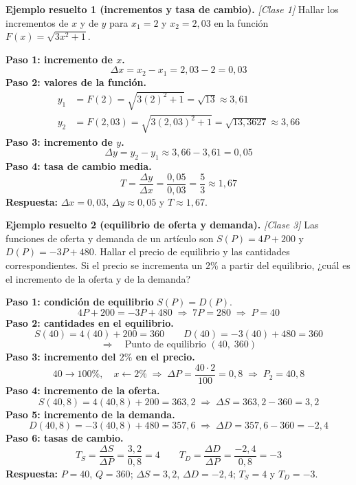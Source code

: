 \documentclass[12pt, letterpaper]{article}
\begin{document}
\noindent\textbf{Ejemplo resuelto 1 (incrementos y tasa de cambio).} \emph{[Clase 1]}
Hallar los incrementos de $x$ y de $y$ para $x_1 = 2$ y $x_2 = 2{,}03$ en la función $F(x) = \sqrt{3x^{2} + 1}$.

\begin{cuadrosolucion}
  \textbf{Paso 1: incremento de $x$.}
  \[
    \Delta x = x_2 - x_1 = 2{,}03 - 2 = 0{,}03
  \]
  \textbf{Paso 2: valores de la función.}
  \begin{align*}
    y_1 &= F(2) = \sqrt{3(2)^{2}+1} = \sqrt{13} \approx 3{,}61 \\
    y_2 &= F(2{,}03) = \sqrt{3(2{,}03)^{2}+1} = \sqrt{13{,}3627} \approx 3{,}66
  \end{align*}
  \textbf{Paso 3: incremento de $y$.}
  \[
    \Delta y = y_2 - y_1 \approx 3{,}66 - 3{,}61 = 0{,}05
  \]
  \textbf{Paso 4: tasa de cambio media.}
  \[
    T = \frac{\Delta y}{\Delta x} = \frac{0{,}05}{0{,}03} = \frac{5}{3} \approx 1{,}67
  \]
  \textbf{Respuesta:} $\Delta x = 0{,}03$, $\Delta y \approx 0{,}05$ y $T \approx 1{,}67$.
\end{cuadrosolucion}

\noindent\textbf{Ejemplo resuelto 2 (equilibrio de oferta y demanda).} \emph{[Clase 3]}
Las funciones de oferta y demanda de un artículo son $S(P) = 4P + 200$ y $D(P) = -3P + 480$. Hallar el precio de equilibrio y las cantidades correspondientes. Si el precio se incrementa un $2\%$ a partir del equilibrio, ¿cuál es el incremento de la oferta y de la demanda?

\begin{cuadrosolucion}
  \textbf{Paso 1: condición de equilibrio} $S(P) = D(P)$.
  \[
    4P + 200 = -3P + 480
    \;\Longrightarrow\; 7P = 280
    \;\Longrightarrow\; \boxed{P = 40}
  \]
  \textbf{Paso 2: cantidades en el equilibrio.}
  \[
    S(40) = 4(40) + 200 = 360
    \qquad
    D(40) = -3(40) + 480 = 360
  \]
  \[
    \Longrightarrow\quad \text{Punto de equilibrio } (40,\;360)
  \]
  \textbf{Paso 3: incremento del $2\%$ en el precio.}
  \[
    40 \to 100\%, \quad x \leftarrow 2\%
    \;\Longrightarrow\; \Delta P = \frac{40 \cdot 2}{100} = 0{,}8
    \;\Longrightarrow\; P_2 = 40{,}8
  \]
  \textbf{Paso 4: incremento de la oferta.}
  \[
    S(40{,}8) = 4(40{,}8) + 200 = 363{,}2
    \;\Longrightarrow\; \Delta S = 363{,}2 - 360 = 3{,}2
  \]
  \textbf{Paso 5: incremento de la demanda.}
  \[
    D(40{,}8) = -3(40{,}8) + 480 = 357{,}6
    \;\Longrightarrow\; \Delta D = 357{,}6 - 360 = -2{,}4
  \]
  \textbf{Paso 6: tasas de cambio.}
  \[
    T_S = \frac{\Delta S}{\Delta P} = \frac{3{,}2}{0{,}8} = 4
    \qquad
    T_D = \frac{\Delta D}{\Delta P} = \frac{-2{,}4}{0{,}8} = -3
  \]
  \textbf{Respuesta:} $P=40$, $Q=360$; $\Delta S = 3{,}2$, $\Delta D = -2{,}4$; $T_S = 4$ y $T_D = -3$.
\end{cuadrosolucion}
\end{document}
